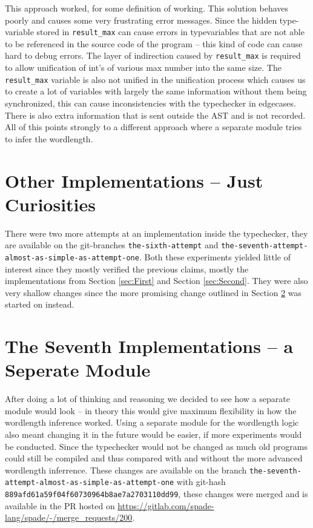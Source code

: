 \documentclass[msc,lith,english]{liuthesis}
\begin{document}
This approach worked, for some definition of working. This solution behaves poorly and causes some very frustrating error messages. Since the hidden type-variable stored in \verb+result_max+ can cause errors in typevariables that are not able to be referenced in the source code of the program -- this kind of code can cause hard to debug errors. The layer of indirection caused by \verb+result_max+ is required to allow unification of int's of various max number into the same size. The \verb+result_max+ variable is also not unified in the unification process which causes us to create a lot of variables with largely the same information without them being synchronized, this can cause inconsistencies with the typechecker in edgecases. There is also extra information that is sent outside the AST and is not recorded. All of this points strongly to a different approach where a separate module tries to infer the wordlength.

\section{Other Implementations -- Just Curiosities}
\label{sec:Other}
There were two more attempts at an implementation inside the typechecker, they are available on the git-branches \verb+the-sixth-attempt+ and \verb+the-seventh-attempt-almost-as-simple-as-attempt-one+. Both these experiments yielded little of interest since they mostly verified the previous claims, mostly the implementations from Section \ref{sec:First} and Section \ref{sec:Second}. They were also very shallow changes since the more promising change outlined in Section \ref{sec:Seven} was started on instead.


\section{The Seventh Implementations -- a Seperate Module}
\label{sec:Seven}
After doing a lot of thinking and reasoning we decided to see how a separate module would look -- in theory this would give maximum flexibility in how the wordlength inference worked. Using a separate module for the wordlength logic also meant changing it in the future would be easier, if more experiments would be conducted. Since the typechecker would not be changed as much old programs could still be compiled and thus compared with and without the more advanced wordlength inferrence. These changes are available on the branch \verb+the-seventh-attempt-almost-as-simple-as-attempt-one+ with git-hash \verb+889afd61a59f04f60730964b8ae7a2703110dd99+, these changes were merged and is available in the PR hosted on \url{https://gitlab.com/spade-lang/spade/-/merge_requests/200}.
\end{document}
